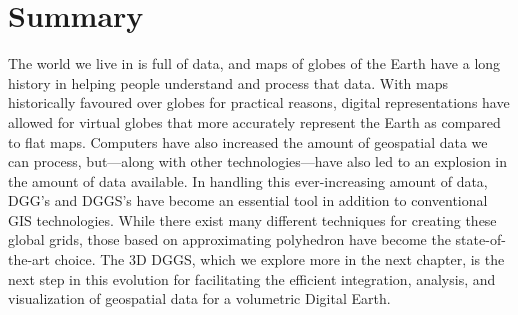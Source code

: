 \section{Summary} \label{chap:2:summary}
The world we live in is full of data, and maps of globes of the Earth have a long history in helping people understand and process that data.
With maps historically favoured over globes for practical reasons, digital representations have allowed for virtual globes that more accurately represent the Earth as compared to flat maps.
Computers have also increased the amount of geospatial data we can process, but---along with other technologies---have also led to an explosion in the amount of data available.
In handling this ever-increasing amount of data, DGG's and DGGS's have become an essential tool in addition to conventional GIS technologies.
While there exist many different techniques for creating these global grids, those based on approximating polyhedron have become the state-of-the-art choice.
The 3D DGGS, which we explore more in the next chapter, is the next step in this evolution for facilitating the efficient integration, analysis, and visualization of geospatial data for a volumetric Digital Earth.
